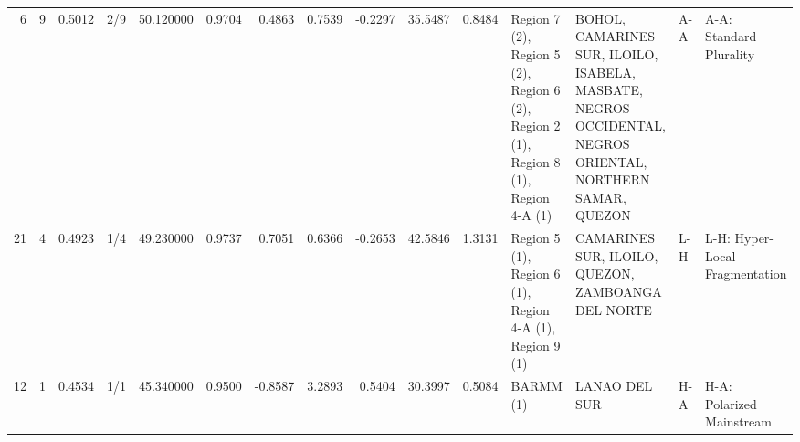 \begin{tabular}{rrrlrrrrrrrllll}
6 & 9 & {\cellcolor[HTML]{779AF7}} \color[HTML]{F1F1F1} 0.5012 & 2/9 & {\cellcolor[HTML]{779AF7}} \color[HTML]{F1F1F1} 50.120000 & 0.9704 & 0.4863 & 0.7539 & -0.2297 & 35.5487 & 0.8484 & Region 7 (2), Region 5 (2), Region 6 (2), Region 2 (1), Region 8 (1), Region 4-A (1) & BOHOL, CAMARINES SUR, ILOILO, ISABELA, MASBATE, NEGROS OCCIDENTAL, NEGROS ORIENTAL, NORTHERN SAMAR, QUEZON & A-A & A-A: Standard Plurality \\
21 & 4 & {\cellcolor[HTML]{6B8DF0}} \color[HTML]{F1F1F1} 0.4923 & 1/4 & {\cellcolor[HTML]{6B8DF0}} \color[HTML]{F1F1F1} 49.230000 & 0.9737 & 0.7051 & 0.6366 & -0.2653 & 42.5846 & 1.3131 & Region 5 (1), Region 6 (1), Region 4-A (1), Region 9 (1) & CAMARINES SUR, ILOILO, QUEZON, ZAMBOANGA DEL NORTE & L-H & L-H: Hyper-Local Fragmentation \\
12 & 1 & {\cellcolor[HTML]{3B4CC0}} \color[HTML]{F1F1F1} 0.4534 & 1/1 & {\cellcolor[HTML]{3B4CC0}} \color[HTML]{F1F1F1} 45.340000 & 0.9500 & -0.8587 & 3.2893 & 0.5404 & 30.3997 & 0.5084 & BARMM (1) & LANAO DEL SUR & H-A & H-A: Polarized Mainstream \\
\bottomrule
\end{tabular}
